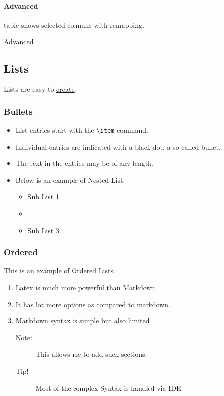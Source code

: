 \documentclass{report}[a4paper,12pt] %
\begin{document}
\paragraph{Advanced} table shows selected colmuns with remapping.
\begin{table}[h!]
  \centering
  \caption{Advanced}
\end{table}

\newpage
\subsection{Lists}
Lists are easy to \href{https://www.overleaf.com/learn/latex/Lists}{create}.

\subsubsection{Bullets}
\begin{itemize}
  \label{lst:bullet}
  \item List entries start with the \verb|\item| command.
  \item Individual entries are indicated with a black dot, a so-called bullet.
  \item The text in the entries may be of any length.
  \item Below is an example of Nested List.
  \begin{itemize}
    \item Sub List 1
    \item \lipsum[1]
    \item Sub List 3
  \end{itemize}
\end{itemize}

\subsubsection{Ordered}
This is an example of Ordered Lists.

\begin{enumerate}[label=(\roman*)]
  \label{lst:order}
  \item Latex is much more powerful than Markdown.
  \item It has lot more options as compared to markdown.
  \item Markdown syntax is simple but also limited.
  \begin{description}
    \item[Note:] This allows me to add such sections.
    \item[Tip!] Most of the complex Syntax is handled via IDE.
  \end{description}
\end{enumerate}
\end{document}
